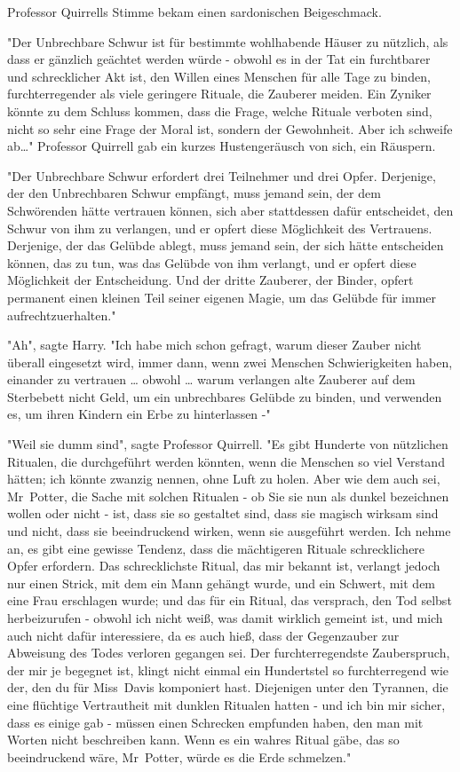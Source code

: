 {Professor Quirrells Stimme bekam einen sardonischen Beigeschmack.

"Der Unbrechbare Schwur ist für bestimmte wohlhabende Häuser zu nützlich, als dass er gänzlich geächtet werden würde - obwohl es in der Tat ein furchtbarer und schrecklicher Akt ist, den Willen eines Menschen für alle Tage zu binden, furchterregender als viele geringere Rituale, die Zauberer meiden. Ein Zyniker könnte zu dem Schluss kommen, dass die Frage, welche Rituale verboten sind, nicht so sehr eine Frage der Moral ist, sondern der Gewohnheit. Aber ich schweife ab…" Professor Quirrell gab ein kurzes Hustengeräusch von sich, ein Räuspern.

"Der Unbrechbare Schwur erfordert drei Teilnehmer und drei Opfer. Derjenige, der den Unbrechbaren Schwur empfängt, muss jemand sein, der dem Schwörenden hätte vertrauen können, sich aber stattdessen dafür entscheidet, den Schwur von ihm zu verlangen, und er opfert diese Möglichkeit des Vertrauens. Derjenige, der das Gelübde ablegt, muss jemand sein, der sich hätte entscheiden können, das zu tun, was das Gelübde von ihm verlangt, und er opfert diese Möglichkeit der Entscheidung. Und der dritte Zauberer, der Binder, opfert permanent einen kleinen Teil seiner eigenen Magie, um das Gelübde für immer aufrechtzuerhalten."

"Ah", sagte Harry. "Ich habe mich schon gefragt, warum dieser Zauber nicht überall eingesetzt wird, immer dann, wenn zwei Menschen Schwierigkeiten haben, einander zu vertrauen … obwohl … warum verlangen alte Zauberer auf dem Sterbebett nicht Geld, um ein unbrechbares Gelübde zu binden, und verwenden es, um ihren Kindern ein Erbe zu hinterlassen -"

"Weil sie dumm sind", sagte Professor Quirrell. "Es gibt Hunderte von nützlichen Ritualen, die durchgeführt werden könnten, wenn die Menschen so viel Verstand hätten; ich könnte zwanzig nennen, ohne Luft zu holen. Aber wie dem auch sei, Mr~Potter, die Sache mit solchen Ritualen - ob Sie sie nun als dunkel bezeichnen wollen oder nicht - ist, dass sie so gestaltet sind, dass sie magisch wirksam sind und nicht, dass sie beeindruckend wirken, wenn sie ausgeführt werden. Ich nehme an, es gibt eine gewisse Tendenz, dass die mächtigeren Rituale schrecklichere Opfer erfordern. Das schrecklichste Ritual, das mir bekannt ist, verlangt jedoch nur einen Strick, mit dem ein Mann gehängt wurde, und ein Schwert, mit dem eine Frau erschlagen wurde; und das für ein Ritual, das versprach, den Tod selbst herbeizurufen - obwohl ich nicht weiß, was damit wirklich gemeint ist, und mich auch nicht dafür interessiere, da es auch hieß, dass der Gegenzauber zur Abweisung des Todes verloren gegangen sei. Der furchterregendste Zauberspruch, der mir je begegnet ist, klingt nicht einmal ein Hundertstel so furchterregend wie der, den du für Miss~Davis komponiert hast. Diejenigen unter den Tyrannen, die eine flüchtige Vertrautheit mit dunklen Ritualen hatten - und ich bin mir sicher, dass es einige gab - müssen einen Schrecken empfunden haben, den man mit Worten nicht beschreiben kann. Wenn es ein wahres Ritual gäbe, das so beeindruckend wäre, Mr~Potter, würde es die Erde schmelzen."

}
